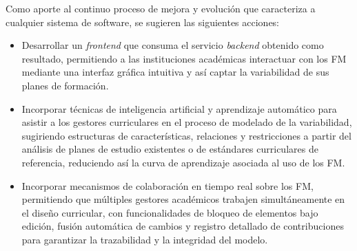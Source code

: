 \suggestions

Como aporte al continuo proceso de mejora y evolución que caracteriza a cualquier sistema de software,
se sugieren las siguientes acciones:

\begin{itemize}
    \item Desarrollar un \textit{frontend} que consuma el servicio \textit{backend} obtenido 
    como resultado, permitiendo a las instituciones académicas interactuar con los \ac{FM} 
    mediante una interfaz gráfica intuitiva y así captar la variabilidad de sus planes de formación.

    \item Incorporar técnicas de inteligencia artificial y aprendizaje automático 
    para asistir a los gestores curriculares en el proceso de modelado de la 
    variabilidad, sugiriendo estructuras de características, relaciones y 
    restricciones a partir del análisis de planes de estudio existentes o de 
    estándares curriculares de referencia, reduciendo así la curva de aprendizaje 
    asociada al uso de los \ac{FM}.

    \item Incorporar mecanismos de colaboración en tiempo real sobre los \ac{FM}, 
    permitiendo que múltiples gestores académicos trabajen 
    simultáneamente en el diseño curricular, con funcionalidades de bloqueo 
    de elementos bajo edición, fusión automática de cambios y registro detallado 
    de contribuciones para garantizar la trazabilidad y la integridad del modelo.
\end{itemize}
